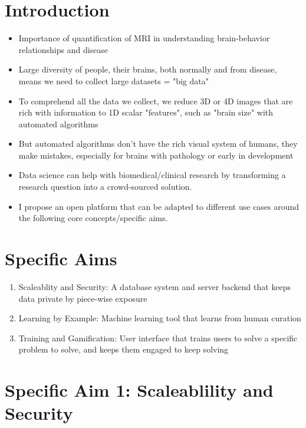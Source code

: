 \section{Introduction}
\begin{itemize}
\item Importance of quantification of MRI in understanding brain-behavior relationships and disease
\item Large diversity of people, their brains, both normally and from disease, means we need to collect large datasets = "big data"
\item To comprehend all the data we collect, we reduce 3D or 4D images that are rich with information to 1D scalar "features", such as "brain size" with automated algorithms
\item But automated algorithms don't have the rich visual system of humans, they make mistakes, especially for brains with pathology or early in development
\item Data science can help with biomedical/clinical research by transforming a research question into a crowd-sourced solution. 
\item I propose an open platform that can be adapted to different use cases around the following core concepts/specific aims.
\end{itemize}

\section{Specific Aims}
\begin{enumerate}
\item Scaleablity and Security: A database system and server backend that keeps data private by piece-wise exposure
\item Learning by Example: Machine learning tool that learns from human curation
\item Training and Gamification: User interface that trains users to solve a specific problem to solve, and keeps them engaged to keep solving
\end{enumerate}

\section{Specific Aim 1: Scaleablility and Security}


